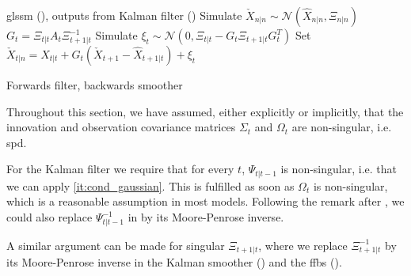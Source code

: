 \begin{algorithm}
    \begin{algorithmic}[1]
        \Require \acrshort{glssm} (), outputs from Kalman filter ()
        \State Simulate $\check X_{n|n} \sim \mathcal N(\hat X_{n|n}, \Xi_{n|n})$
            \State $G_{t} = \Xi_{t|t}A_{t}\Xi^{-1}_{t + 1 | t}$
            \State Simulate $\xi_{t} \sim \mathcal N(0, \Xi_{t|t} - G_{t}\Xi_{t+1|t}G^{T}_t)$
            \State Set $\check X_{t|n} = \hat X_{t|t} + G_{t} \left( \check X_{t + 1} - \hat X_{t + 1| t} \right) + \xi_{t}$
        \EndFor
    \end{algorithmic}
    \caption{Forwards filter, backwards smoother \citep[Proposition 1]{Fruhwirth-Schnatter1994Data}} \label{alg:ffbs}
\end{algorithm}

\begin{remark}
    \label{rem:regular_covs}
    Throughout this section, we have assumed, either explicitly or implicitly, that the innovation and observation covariance matrices $\Sigma_{t}$ and $\Omega_{t}$ are non-singular, i.e. \acrshort{spd}.

    For the Kalman filter we require that for every $t$, $\Psi_{t|t-1}$ is non-singular, i.e. that we can apply  \ref{it:cond_gaussian}. This is fulfilled as soon as $\Omega_{t}$ is non-singular, which is a reasonable assumption in most models. Following the remark after , we could also replace $\Psi_{t|t-1}^{-1}$ in  by its Moore-Penrose inverse. 

    A similar argument can be made for singular $\Xi_{t+1|t}$, where we replace $\Xi_{t+1|t}^{-1}$ by its Moore-Penrose inverse in the Kalman smoother () and the \acrshort{ffbs} (). 
\end{remark}

